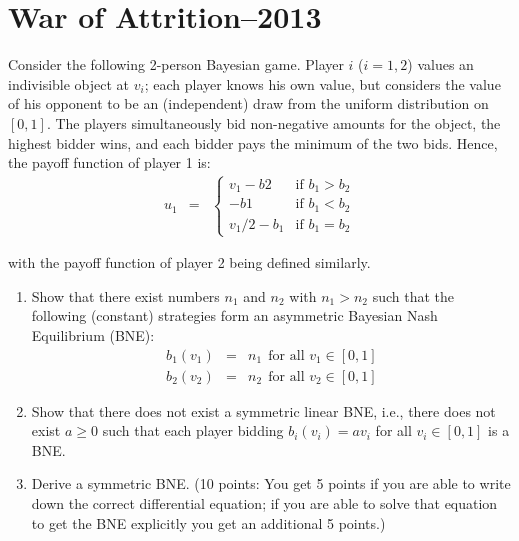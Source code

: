 \documentclass[a4paper]{article}
\begin{document}
\section*{War of Attrition--2013}
Consider the following 2-person Bayesian game. Player $i$ ($i = 1,2$) values an indivisible object at $v_i$; each player knows his own value, but considers the value of his opponent to be an (independent) draw from the uniform distribution on $[0,1]$. The players simultaneously bid non-negative amounts for the object, the highest bidder wins, and each bidder pays the
minimum of the two bids. Hence, the payoff function of player 1 is:
\begin{eqnarray*}
u_{1}	&=&	\begin{cases}
v_{1}-b{2}    &    \text{if $b_{1}>b_{2}$}    \\
-b{1}        &    \text{if $b_{1}<b_{2}$}    \\
v_{1}/2-b_{1}    &\text{if $b_{1}=b_{2}$}
\end{cases}
\end{eqnarray*}

with the payoff function of player 2 being defined similarly.
\begin{enumerate}
	\item Show that there exist numbers $n_{1}$ and $n_{2}$ with $n_{1}>n_{2}$ such that the following (constant) strategies form an asymmetric Bayesian Nash Equilibrium (BNE):
\begin{eqnarray*}
b_{1}(v_{1})    &=&n_{1} \ \ \text{for all $v_{1}\in[0,1]$}    \\
b_{2}(v_{2})    &=&n_{2} \ \ \text{for all $v_{2}\in[0,1]$} 
\end{eqnarray*}
	\item Show that there does not exist a symmetric linear BNE, i.e., there does not exist $a\ge 0$ such that each player bidding $b_{i}(v_{i}) = av_{i}$ for all $v_{i} \in [0, 1]$ is a BNE. 
	\item  Derive a symmetric BNE. (10 points: You get 5 points if you are able to write down the correct differential equation; if you are able to solve that equation to get the BNE explicitly you get an additional 5 points.)
\end{enumerate}
\end{document}
